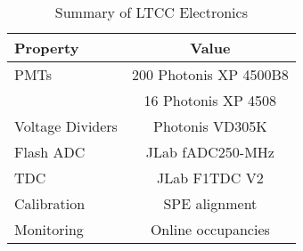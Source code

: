 \begin{table}[h]
	\begin{center}
		\begin{tabular}{| l | c |}
			\hline \hline
			Property                 & Value \\
			\hline
			PMTs             & 200 Photonis XP 4500B8    \\
	                       & 16 Photonis XP 4508       \\
			Voltage Dividers & Photonis VD305K           \\
			Flash ADC        & JLab fADC250-MHz          \\
			TDC              & JLab F1TDC V2             \\
			Calibration      & SPE alignment             \\
			Monitoring       & Online occupancies        \\
			\hline \hline
		\end{tabular}
	\end{center}
	\caption{Summary of LTCC Electronics}\label{tab:ltccChannels}
\end{table}

